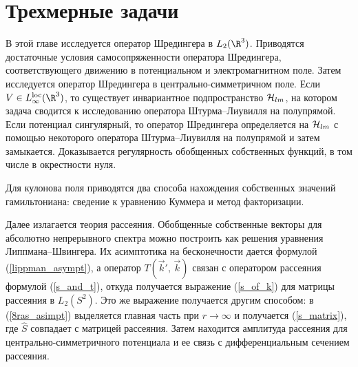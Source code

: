 \documentclass[a4paper
]{article}
\begin{document}
\section{Трехмерные задачи}
\label{3dim_probl}
В этой главе исследуется оператор Шредингера в $L_2(\R^3)$. Приводятся
достаточные условия самосопряженности оператора Шредингера, соответствующего
движению в потенциальном и электромагнитном поле. Затем исследуется
оператор Шредингера в центрально-симметричном поле. Если $V\in L_\infty ^{\rm{loc}}
(\R^3)$, то существует инвариантное подпространство ${\cal H}_{lm}$,
на котором задача сводится к исследованию оператора Штурма--Лиувилля на
полупрямой. Если потенциал сингулярный, то оператор Шредингера определяется на
${\cal H}_{lm}$ с помощью некоторого оператора Штурма--Лиувилля на
полупрямой и затем замыкается. Доказывается регулярность обобщенных
собственных функций, в том числе в окрестности нуля. \par
Для кулонова поля приводятся два способа нахождения собственных значений
гамильтониана: сведение к уравнению Куммера и метод факторизации. \par
Далее излагается теория рассеяния. Обобщенные собственные векторы для
абсолютно непрерывного спектра можно построить как решения уравнения
Липпмана--Швингера. Их асимптотика на бесконечности дается формулой
(\ref{lippman_asympt}), а оператор $T(\vec k', \, \vec k)$ связан с
оператором рассеяния формулой (\ref{s_and_t}), откуда получается выражение
(\ref{s_of_k}) для матрицы рассеяния в $L_2(S^2)$. Это же выражение получается
другим способом: в (\ref{8ras_asimpt}) выделяется главная часть при
$r\rightarrow \infty$ и получается (\ref{s_matrix}), где $\hat S$ совпадает
с матрицей рассеяния. Затем находится амплитуда рассеяния для
центрально-симметричного потенциала и ее связь с дифференциальным
сечением рассеяния.
\end{document}
